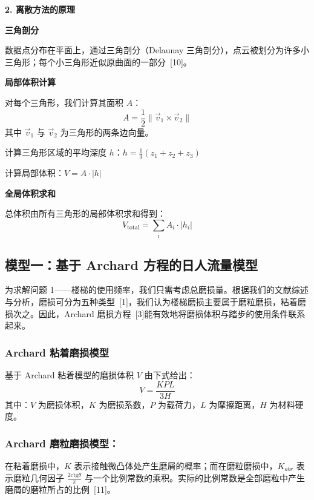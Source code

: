 \documentclass[11pt,a4paper]{ctexart}
\newcommand{\runin}[1]{\par\noindent\textbf{#1}\par\nobreak}
\begin{document}
\runin{2. 离散方法的原理}

\runin{三角剖分}

数据点分布在平面上，通过三角剖分（Delaunay 三角剖分），点云被划分为许多小三角形；每个小三角形近似原曲面的一部分\ [10]。

\runin{局部体积计算}

对每个三角形，我们计算其面积 $A$：
\begin{equation}
A=\frac{1}{2}\|\vec{v}_1\times\vec{v}_2\| \tag{2}
\end{equation}
其中 $\vec{v}_1$ 与 $\vec{v}_2$ 为三角形的两条边向量。

计算三角形区域的平均深度 $h$：$h=\frac{1}{3}(z_1+z_2+z_3)$

计算局部体积：$V=A\cdot|h|$

\runin{全局体积求和}

总体积由所有三角形的局部体积求和得到：
\begin{equation}
V_{\mathrm{total}}=\sum_{i}A_i\cdot|h_i| \tag{3}
\end{equation}

\subsection{模型一：基于 Archard 方程的日人流量模型}

为求解问题 1——楼梯的使用频率，我们只需考虑总磨损量。根据我们的文献综述与分析，磨损可分为五种类型\ [1]，我们认为楼梯磨损主要属于磨粒磨损，粘着磨损次之。因此，Archard 磨损方程\ [3]能有效地将磨损体积与踏步的使用条件联系起来。

\subsubsection{Archard 粘着磨损模型}

基于 Archard 粘着模型的磨损体积 $V$ 由下式给出：
\begin{equation}
V=\frac{KPL}{3H} \tag{4}
\end{equation}
其中：$V$ 为磨损体积，$K$ 为磨损系数，$P$ 为载荷力，$L$ 为摩擦距离，$H$ 为材料硬度。

\subsubsection{Archard 磨粒磨损模型：}

在粘着磨损中，$K$ 表示接触微凸体处产生磨屑的概率；而在磨粒磨损中，$K_{abr}$ 表示磨粒几何因子 $\frac{2\mathrm{ctg}\theta}{\pi}$ 与一个比例常数的乘积。实际的比例常数是全部磨粒中产生磨屑的磨粒所占的比例\ [11]。
\end{document}
